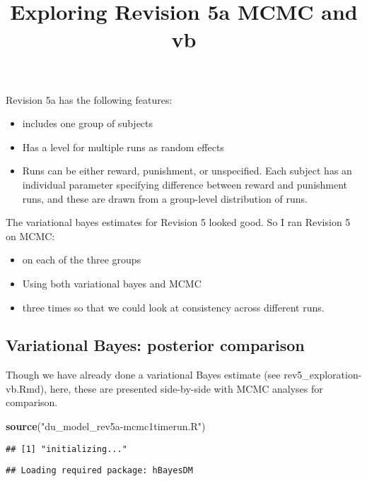 \documentclass[]{article}
\title{Exploring Revision 5a MCMC and vb}
\author{}
\date{}
\newenvironment{Shaded}{\begin{snugshade}}{\end{snugshade}}
\newcommand{\KeywordTok}[1]{\textcolor[rgb]{0.13,0.29,0.53}{\textbf{{#1}}}}
\newcommand{\StringTok}[1]{\textcolor[rgb]{0.31,0.60,0.02}{{#1}}}
\newcommand{\NormalTok}[1]{{#1}}
\providecommand{\tightlist}{%
  \setlength{\itemsep}{0pt}\setlength{\parskip}{0pt}}
\begin{document}
\maketitle

Revision 5a has the following features:

\begin{itemize}
\tightlist
\item
  includes one group of subjects
\item
  Has a level for multiple runs as random effects
\item
  Runs can be either reward, punishment, or unspecified. Each subject
  has an individual parameter specifying difference between reward and
  punishment runs, and these are drawn from a group-level distribution
  of runs.
\end{itemize}

The variational bayes estimates for Revision 5 looked good. So I ran
Revision 5 on MCMC:

\begin{itemize}
\tightlist
\item
  on each of the three groups
\item
  Using both variational bayes and MCMC
\item
  three times so that we could look at consistency across different
  runs.
\end{itemize}

\subsection{Variational Bayes: posterior
comparison}\label{variational-bayes-posterior-comparison}

Though we have already done a variational Bayes estimate (see
rev5\_exploration-vb.Rmd), here, these are presented side-by-side with
MCMC analyses for comparison.

\begin{Shaded}
\begin{Highlighting}[]
\KeywordTok{source}\NormalTok{(}\StringTok{"du_model_rev5a-mcmc1timerun.R"}\NormalTok{)}
\end{Highlighting}
\end{Shaded}

\begin{verbatim}
## [1] "initializing..."
\end{verbatim}

\begin{verbatim}
## Loading required package: hBayesDM
\end{verbatim}
\end{document}
